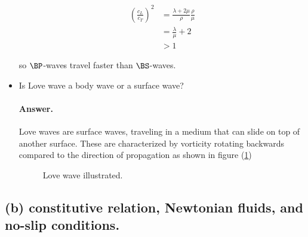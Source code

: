\begin{itemize}
\begin{align*}
\left( \frac{c_L}{c_T} \right)^2 
&= \frac{ \lambda + 2 \mu}{\rho} \frac{\rho}{\mu}  \\
&= \frac{\lambda}{\mu} + 2  \\
&> 1
\end{align*}

so $\BP$-waves travel faster than $\BS$-waves.

\item Is Love wave a body wave or a surface wave?

\paragraph{Answer.}

Love waves are surface waves, traveling in a medium that can slide on top of another surface.  These are characterized by vorticity rotating backwards compared to the direction of propagation as shown in figure (\ref{fig:continuumMidtermReflection:continuumMidtermReflectionFig2})

\begin{figure}[htp]
   \centering
   \def\svgwidth{0.6\columnwidth}
   
   \caption{Love wave illustrated.}\label{fig:continuumMidtermReflection:continuumMidtermReflectionFig2}
\end{figure}
\end{itemize}

\subsection{(b) constitutive relation, Newtonian fluids, and no-slip conditions.}

